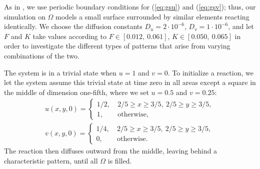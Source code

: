 \documentclass[a4paper,11pt]{article}
\newcommand{\ban}[1]{\begin{align}    #1    \end{align}}
\begin{document}
As in \cite{Wang}, we use periodic boundary conditions for (\ref{eq:gsu}) and (\ref{eq:gsv}); thus, our simulation on $\Omega$ models a small surface surrounded by similar elements reacting identically. We choose the diffusion constants $D_u = 2 \cdot 10^{-6}$, $D_v = 1 \cdot 10^{-6}$, and let $F$ and $K$ take values according to $F \in [0.012, \ 0.061]$, $K \in [0.050,\ 0.065]$ in order to investigate the different types of patterns that arise from varying combinations of the two.

The system is in a trivial state when $u = 1$ and $v=0$.  To initialize a reaction, we let the system assume this trivial state at time zero in all areas except a square in the middle of dimension one-fifth, where we set $u = 0.5$ and $v = 0.25$:
\ban{
\label{eq:icu}
u(x,y,0) = \begin{cases}
1/2, & \ 2/5 \ge x \ge 3/5, \ 2/5 \ge y \ge 3/5,\\
1, & \ \text{otherwise},
 \end{cases}\\
 \label{eq:icv}
 v(x,y,0) = \begin{cases}
1/4, & \ 2/5 \ge x \ge 3/5, \ 2/5 \ge y \ge 3/5,\\
0, & \ \text{otherwise}.
 \end{cases}
}
The reaction then diffuses outward from the middle, leaving behind a characteristic pattern, until all $\Omega$ is filled.
\end{document}
